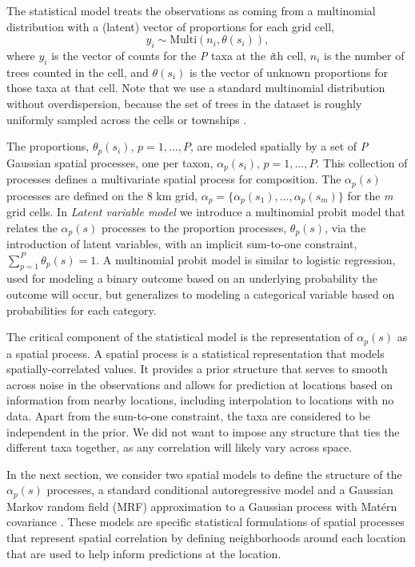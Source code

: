 \documentclass[10pt,letterpaper]{article}
\newcommand{\matern}{Mat\'{e}rn }
\begin{document}
The statistical model treats the observations as coming from a multinomial
distribution with a (latent) vector of proportions for each grid cell,
\[
y_{i}\sim\mbox{Multi}(n_{i},\theta(s_{i})),
\]
where $y_{i}$ is the vector of counts for the  \emph{P} taxa at the \emph{i}th
cell, $n_{i}$ is the number of trees counted in the cell, and $\theta(s_{i})$
is the vector of unknown proportions for those taxa at that cell.
Note that we use a standard multinomial distribution without overdispersion,
because the set of trees in the dataset is roughly uniformly sampled
across the cells or townships \cite{goring2015composition}.

The proportions, $\theta_{p}(s_{i}),\, p=1,\ldots,P$, are modeled
spatially by a set of \emph{P} Gaussian spatial processes, one per taxon,
$\alpha_{p}(s_{i}),\, p=1,\ldots,P$. This collection of processes
defines a multivariate spatial process for composition. The $\alpha_{p}(s)$
processes are defined on the 8 km grid, $\alpha_{p}=\{\alpha_{p}(s_{1}),\ldots,\alpha_{p}(s_{m})\}$
for the \emph{m} grid cells. In  \emph{Latent variable model}
we introduce a multinomial probit model that relates the $\alpha_{p}(s)$
processes to the proportion processes, $\theta_{p}(s)$, via the introduction
of latent variables, with an implicit sum-to-one constraint, $\sum_{p=1}^{P}\theta_{p}(s)=1$.
A multinomial probit model is similar to logistic
regression, used for modeling a binary outcome based on an underlying
probability the outcome will occur, but generalizes to modeling a
categorical variable based on probabilities for each category. 



The critical component of the statistical model is the representation
of $\alpha_{p}(s)$ as a spatial process. A spatial
process is a statistical representation that models spatially-correlated
values. It provides a prior structure that serves to smooth across
noise in the observations and allows for prediction at locations based
on information from nearby locations, including interpolation to locations
with no data. Apart from the sum-to-one constraint, the taxa are considered
to be independent in the prior. We did not want to impose any structure
that ties the different taxa together, as any correlation will likely
vary across space.

In the next section, we consider two spatial models to define the
structure of the $\alpha_{p}(s)$ processes, a standard conditional
autoregressive model \cite{Bane:etal:2004} and a Gaussian Markov
random field (MRF) approximation to a Gaussian process with \matern
covariance \cite{Lind:etal:2011}. These models are
specific statistical formulations of spatial processes that represent
spatial correlation by defining neighborhoods around each location
that are used to help inform predictions at the location. 
\end{document}
